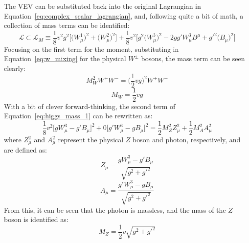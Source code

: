 The VEV can be substituted back into the original Lagrangian in Equation~\ref{eq:complex_scalar_lagrangian}, and, following quite a bit of math, a collection of mass terms can be identified:
\begin{equation}
  \mathcal{L} \subset \mathcal{L}_M \equiv \frac{1}{8}v^{2}g^{2}\bigg[\big(W_{\mu}^1\big)^2 + \big(W_{\mu}^2\big)^2\bigg] + \frac{1}{8}v^2\bigg[g^{2}\big(W_{\mu}^3\big)^2 - 2gg'W_{\mu}^{3}B^{\mu} + g'^{2}\big(B_{\mu}\big)^{2}\bigg]
  \label{eq:higgs_mass_1}
\end{equation}
Focusing on the first term for the moment, substituting in Equation~\ref{eq:w_mixing} for the physical $W^\pm$ bosons, the mass term can be seen clearly:
\begin{equation}
  M_W^{2}W^{+}W^{-} = \bigg(\frac{1}{2}vg\bigg)^{2}W^{+}W^{-}
\end{equation}
\begin{equation}
  M_W = \frac{1}{2}vg
\end{equation}
With a bit of clever forward-thinking, the second term of Equation~\ref{eq:higgs_mass_1} can be rewritten as:
\begin{equation}
  \frac{1}{8}v^{2}\bigg[gW_{\mu}^{3} - g'B_{\mu}\bigg]^2 + 0\bigg[g'W_{\mu}^{3} - gB_{\mu}\bigg]^2 =  \frac{1}{2}M_{Z}^{2}Z_{\mu}^{2} + \frac{1}{2}M_{A}^{2}A_{\mu}^{2}
  \label{eq:higgs_mass_2}
\end{equation}
where $Z_{\mu}^{2}$ and $A_{\mu}^2$ represent the physical $Z$ boson and photon, respectively, and are defined as:
\begin{equation}
 Z_{\mu} = \frac{gW_{\mu}^{3} - g'B_{\mu}}{\sqrt{g^2+g'^2}}
  \label{eq:higgs_z}
\end{equation}
\begin{equation}
  A_{\mu} = \frac{g'W_{\mu}^{3} - gB_{\mu}}{\sqrt{g^2+g'^2}}
  \label{eq:higgs_a}
\end{equation}
From this, it can be seen that the photon is massless, and the mass of the $Z$ boson is identified as:
\begin{equation}
  M_Z = \frac{1}{2}v\sqrt{g^2+g'^2}
\end{equation}

